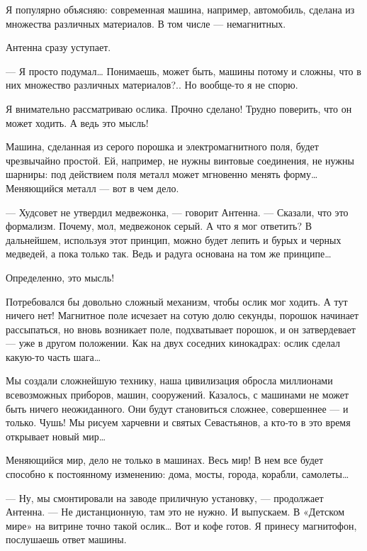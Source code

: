    Я популярно объясняю: современная машина, например, автомобиль, сделана из
   множества различных материалов. В том числе — немагнитных.

   Антенна сразу уступает.

   — Я просто подумал… Понимаешь, может  быть, машины потому и сложны, что  в
   них множество различных материалов?.. Но вообще-то я не спорю.

   Я внимательно рассматриваю ослика. Прочно сделано! Трудно поверить, что он
   может ходить. А ведь это мысль!

   Машина, сделанная  из  серого  порошка  и  электромагнитного  поля,  будет
   чрезвычайно простой. Ей, например, не нужны винтовые соединения, не  нужны
   шарниры:  под  действием  поля   металл  может  мгновенно  менять   форму…
   Меняющийся металл — вот в чем дело.

   — Худсовет не утвердил медвежонка, —  говорит Антенна. — Сказали, что  это
   формализм. Почему,  мол,  медвежонок  серый.  А  что  я  мог  ответить?  В
   дальнейшем, используя этот принцип,  можно будет лепить  и бурых и  черных
   медведей, а пока только так. Ведь и радуга основана на том же принципе…

   Определенно, это мысль!

   Потребовался бы довольно сложный механизм,  чтобы ослик мог ходить. А  тут
   ничего нет!  Магнитное  поле  исчезает  на  сотую  долю  секунды,  порошок
   начинает рассыпаться, но вновь возникает поле, подхватывает порошок, и  он
   затвердевает — уже в  другом положении. Как  на двух соседних  кинокадрах:
   ослик сделал какую-то часть шага…

   Мы  создали  сложнейшую  технику,  наша  цивилизация  обросла   миллионами
   всевозможных приборов, машин,  сооружений. Казалось, с  машинами не  может
   быть ничего неожиданного. Они будут  становиться сложнее, совершеннее —  и
   только. Чушь! Мы  рисуем харчевни  и святых  Севастьянов, а  кто-то в  это
   время открывает новый мир…

   Меняющийся мир,  дело не  только в  машинах.  Весь мир!  В нем  все  будет
   способно к постоянному изменению: дома, мосты, города, корабли, самолеты…

   —  Ну,  мы  смонтировали  на  заводе  приличную  установку,  —  продолжает
   Антенна. — Не  дистанционную, там это  не нужно. И  выпускаем. В  «Детском
   мире»  на  витрине  точно  такой  ослик…  Вот  и  кофе  готов.  Я  принесу
   магнитофон, послушаешь ответ машины.

